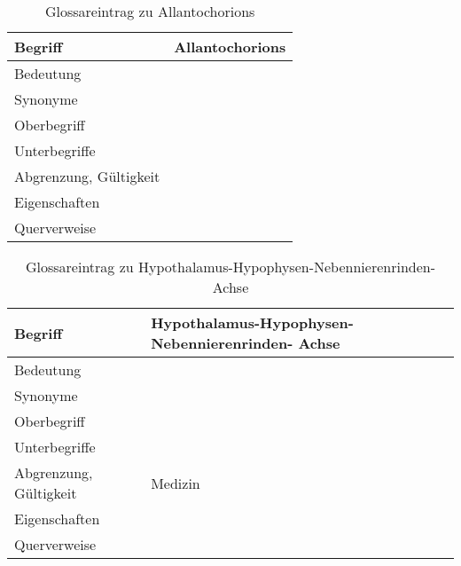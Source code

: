 \begin{table}[h]
	\centering	
	\begin{tabular}{ p{4.5cm} p{10.5cm} } 
		\toprule[1pt]
		\rowcolor{maroon!30}
		\textbf{Begriff} &  \textbf{Allantochorions}\\		
		\midrule
		Bedeutung  & \\		
		Synonyme  & \\				
		Oberbegriff  &  \\		
		Unterbegriffe   & \\		
		Abgrenzung, Gültigkeit  & \\				
		Eigenschaften  & \\				
		Querverweise  & \\
		\bottomrule					
		
	\end{tabular}
	\label{tab: Glossareintrag zu Allantochorions}
	\caption{Glossareintrag zu Allantochorions}
\end{table}

\begin{table}[h]
	\centering	
	\begin{tabular}{ p{4.5cm} p{10.5cm} } 
		\toprule[1pt]
		\rowcolor{maroon!30}
		\textbf{Begriff} &  \textbf{Hypothalamus-Hypophysen-Nebennierenrinden- Achse}\\		
		\midrule
		Bedeutung  & \\		
		Synonyme  & \\			
		Oberbegriff  &  \\		
		Unterbegriffe   & \\		
		Abgrenzung, Gültigkeit  & Medizin\\			
		Eigenschaften  &\\			
		Querverweise  & \\
		\bottomrule					
		
	\end{tabular}
	\label{tab: Glossareintrag zu Hypothalamus-Hypophysen-Nebennierenrinden- Achse}
	\caption{Glossareintrag zu Hypothalamus-Hypophysen-Nebennierenrinden- Achse}
\end{table}
